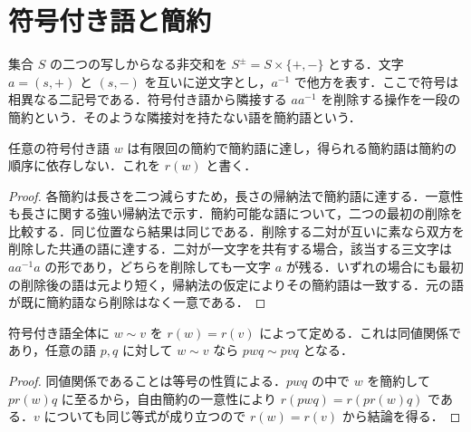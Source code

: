 \section{符号付き語と簡約}
\begin{defn}[符号付き語と自由簡約]
集合 $S$ の二つの写しからなる非交和を $S^\pm=S\times\{+,-\}$ とする．文字 $a=(s,+)$ と $(s,-)$ を互いに逆文字とし，$a^{-1}$ で他方を表す．ここで符号は相異なる二記号である．符号付き語から隣接する $aa^{-1}$ を削除する操作を一段の簡約という．そのような隣接対を持たない語を簡約語という．
\end{defn}
\begin{prop}[自由簡約の一意性]
任意の符号付き語 $w$ は有限回の簡約で簡約語に達し，得られる簡約語は簡約の順序に依存しない．これを $r(w)$ と書く．
\end{prop}
\begin{proof}
各簡約は長さを二つ減らすため，長さの帰納法で簡約語に達する．一意性も長さに関する強い帰納法で示す．簡約可能な語について，二つの最初の削除を比較する．同じ位置なら結果は同じである．削除する二対が互いに素なら双方を削除した共通の語に達する．二対が一文字を共有する場合，該当する三文字は $aa^{-1}a$ の形であり，どちらを削除しても一文字 $a$ が残る．いずれの場合にも最初の削除後の語は元より短く，帰納法の仮定によりその簡約語は一致する．元の語が既に簡約語なら削除はなく一意である．
\end{proof}
\begin{prop}[簡約語による同値関係]
符号付き語全体に $w\sim v$ を $r(w)=r(v)$ によって定める．これは同値関係であり，任意の語 $p,q$ に対して $w\sim v$ なら $pwq\sim pvq$ となる．
\end{prop}
\begin{proof}
同値関係であることは等号の性質による．$pwq$ の中で $w$ を簡約して $pr(w)q$ に至るから，自由簡約の一意性により $r(pwq)=r(pr(w)q)$ である．$v$ についても同じ等式が成り立つので $r(w)=r(v)$ から結論を得る．
\end{proof}
